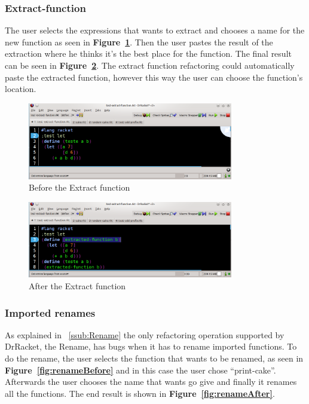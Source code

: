 \subsubsection{Extract-function}
The user selects the expressions that wants to extract and chooses a name for the new function as seen in {\bf Figure~\ref{fig:extractBefore}}.
Then the user pastes the result of the extraction where he thinks it's the best place for the function. 
The final result can be seen in {\bf Figure~\ref{fig:extractAfter}}.
The extract function refactoring could automatically paste the extracted function, however this way the user can choose the function's location.
\begin{figure}[htbp]
	\centering
	\includegraphics[width=0.8\textwidth]{img/extractV2-1.png}
	\caption{Before the Extract function}
	\label{fig:extractBefore}
\end{figure}

\begin{figure}[htbp]
	\centering
	\includegraphics[width=0.8\textwidth]{img/extractV2-2.png}
	\caption{After the Extract function}
	\label{fig:extractAfter}
\end{figure}

\subsubsection{Imported renames}
As explained in ~\ref{ssub:Rename} the only refactoring operation supported by DrRacket, the Rename, has bugs when it has to rename imported functions.
To do the rename, the user selects the function that wants to be renamed, as seen in {\bf Figure~\ref{fig:renameBefore}} and in this case the user chose ``print-cake''.
Afterwards the user chooses the name that wants go give and finally it renames all the functions. 
The end result is shown in {\bf Figure~\ref{fig:renameAfter}}.

